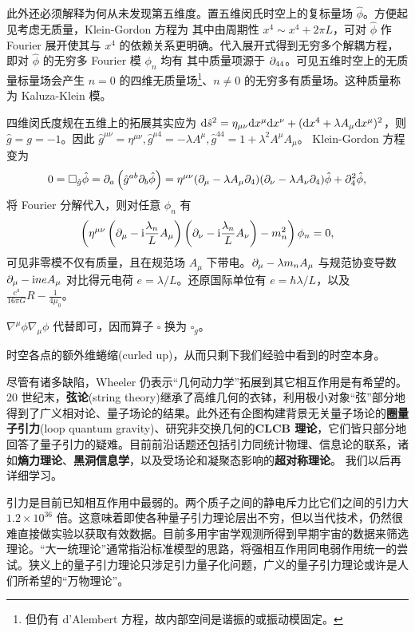 此外还必须解释为何从未发现第五维度。置五维闵氏时空上的复标量场 $\hat\phi$。方便起见考虑无质量，Klein-Gordon 方程为
其中由周期性 $x^4\sim x^4+2\pi L$，可对 $\hat\phi$ 作 Fourier 展开使其与 $x^4$ 的依赖关系更明确。代入展开式得到无穷多个解耦方程，即对 $\hat\phi$ 的无穷多 Fourier 模 $\phi_n$ 均有
其中质量项源于 $\partial_{44}$。可见五维时空上的无质量标量场会产生 $n=0$ 的四维无质量场\footnote{但仍有 d'Alembert 方程，故内部空间是谐振的或振动模固定。}、$n\ne 0$ 的无穷多有质量场。这种质量称为 Kaluza-Klein 模。

四维闵氏度规在五维上的拓展其实应为 $\dd\hat s^2=\eta_{\mu\nu}\dd x^\mu \dd x^\nu+(\dd x^4+\lambda A_\mu\dd x^\mu)^2$，则 $\hat g=g=-1$。因此 $\hat g^{\mu\nu}=\eta^{\mu\nu},\hat g^{\mu 4}=-\lambda A^\mu,\hat g^{44}=1+\lambda^2 A^\mu A_\mu$。
Klein-Gordon 方程变为
\[
    0=\square_{\hat g}\hat\phi=\partial_a\left(\hat g^{ab}\partial_b \hat\phi\right)=\eta^{\mu\nu}(\partial_\mu-\lambda A_\mu\partial_4)(\partial_\nu-\lambda A_\nu\partial_4)\hat\phi+\partial_4^2\hat\phi,
\]
将 Fourier 分解代入，则对任意 $\phi_n$ 有
\[
    \left(\eta^{\mu\nu}\left(\partial_\mu-\mathrm{i}\frac{\lambda_n}{L} A_\mu\right)\left(\partial_\nu-\mathrm{i}\frac{\lambda_n}{L} A_\nu\right)-m_n^2\right)\phi_n=0,
\]
可见非零模不仅有质量，且在规范场 $A_\mu$ 下带电。$\partial_\mu-\lambda m_n A_\mu$ 与规范协变导数 $\partial_\mu-\mathrm{i} ne A_\mu$ 对比得元电荷 $e=\lambda/L$。还原国际单位有 $e=\hbar\lambda/L$，以及 $\frac{c^4}{16\pi G}R-\frac{1}{4\mu_0}$。

$\nabla^\mu\phi\nabla_\mu\phi$ 代替即可，因而算子 $\square$ 换为 $\square_g$。

时空各点的额外维蜷缩(curled up)，从而只剩下我们经验中看到的时空本身。

尽管有诸多缺陷，Wheeler 仍表示“几何动力学”拓展到其它相互作用是有希望的。20 世纪末，\textbf{弦论}(string theory)继承了高维几何的衣钵，利用极小对象“弦”部分地得到了广义相对论、量子场论的结果。此外还有企图构建背景无关量子场论的\textbf{圈量子引力}(loop quantum gravity)、研究非交换几何的\textbf{CLCB 理论}，它们皆只部分地回答了量子引力的疑难。目前前沿话题还包括引力同统计物理、信息论的联系，诸如\textbf{熵力理论}、\textbf{黑洞信息学}，以及受场论和凝聚态影响的\textbf{超对称理论}。
我们以后再详细学习。

引力是目前已知相互作用中最弱的。两个质子之间的静电斥力比它们之间的引力大 $1.2 \times 10^{36}$ 倍。这意味着即使各种量子引力理论层出不穷，但以当代技术，仍然很难直接做实验以获取有效数据。目前多用宇宙学观测所得到早期宇宙的数据来筛选理论。“大一统理论”通常指沿标准模型的思路，将强相互作用同电弱作用统一的尝试。狭义上的量子引力理论只涉足引力量子化问题，广义的量子引力理论或许是人们所希望的“万物理论”。

